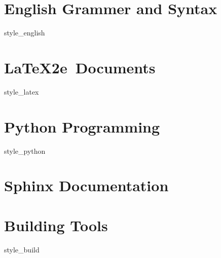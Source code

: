 \documentclass{book}
\begin{document}
\chapter{English Grammer and Syntax}
{style_english}

\chapter{\LaTeX2e\ Documents}
{style_latex}

\chapter{Python Programming}
{style_python}

\chapter{Sphinx Documentation}

\chapter{Building Tools}
{style_build}

\printbibliography
\end{document}
